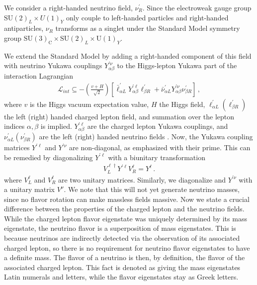 We consider a right-handed neutrino field, $\nu^\prime_R$. Since the electroweak gauge group $\text{SU}(2)_L \times U(1)_Y$ only couple to 
left-handed particles and right-handed antiparticles, $\nu_R$ transforms as a singlet under the Standard Model symmetry 
group $\mathrm{SU}(3)_{\mathrm{C}} \times \mathrm{SU}(2)_{L} \times \mathrm{U}(1)_{Y}$. 

We extend the Standard Model by adding a right-handed component of this field with neutrino Yukawa couplings $Y_{\alpha \beta}^{\prime \nu}$ to the Higgs-lepton Yukawa part of the interaction Lagrangian 
\begin{align} 
    \mathcal{L}_{int} \subseteq -\left( \frac{v + H}{\sqrt{2}} \right) \left[ \bar{\ell}^{\prime}_{\alpha L} Y_{\alpha \beta}^{\prime \ell} \ell_{\beta R}^{\prime} + \bar{\nu}_{\alpha L}^{\prime} Y_{\alpha \beta}^{\prime \nu} \nu_{\beta R}^{\prime}\right]\,,
\end{align}
where $v$ is the Higgs vacuum expectation value, $H$ the Higgs field, $\ell_{\alpha L}^\prime (\ell_{\beta R}^\prime)$ the left (right) handed charged lepton field, and summation over the lepton indices $\alpha,\beta$ is implied. $Y_{\alpha \beta}^{\prime \ell}$ are the charged lepton Yukawa couplings, and $\nu^\prime_{\alpha L}(\nu^\prime_{\beta R})$ are the left (right) handed neutrino fields .
Now, the Yukawa coupling matrices $Y^{\prime \ell}$ and $Y^{\prime \nu}$ are non-diagonal, as emphasized with their prime. 
This can be remedied by diagonalizing $Y^{\prime \ell}$  with a biunitary transformation
\begin{align}
    V_{ L}^{\ell \dagger} Y^{\prime \ell} V_{ R}^{\ell}=Y^{\ell} \,.
\end{align}
where $V^\ell_L$ and $V^\ell_R$ are two unitary matrices.
Similarly, we diagonalize and $Y^{\prime \nu}$ with a unitary matrix $V^\nu$. We note that this will not yet generate neutrino masses, 
since no flavor rotation can make massless fields massive.
Now we state a crucial difference between the properties of the charged lepton and the neutrino fields.
While the charged lepton flavor eigenstate was uniquely determined by its mass eigenstate, the neutrino flavor is a superposition of mass eigenstates. 
This is because neutrinos are indirectly detected via the observation of its associated charged lepton, so there is no requirement for neutrino flavor eigenstates to have a definite mass. 
The flavor of a neutrino is then, by definition, the flavor of the associated charged lepton. 
This fact is denoted as giving the mass eigenstates Latin numerals and letters, while the flavor eigenstates stay as Greek letters.

